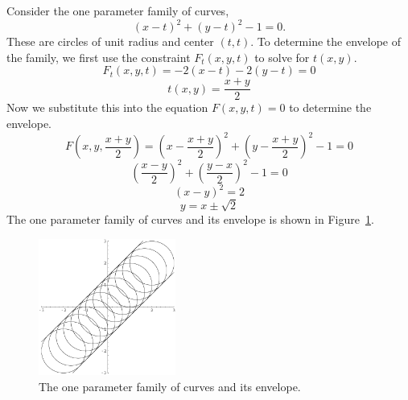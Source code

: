 \begin{Example}
  Consider the one parameter family of curves,
  \[
  (x-t)^2 + (y-t)^2 - 1 = 0.
  \]
  These are circles of unit radius and center $(t,t)$.  To determine the 
  envelope of the family, we first use the constraint $F_t(x,y,t)$ to 
  solve for $t(x,y)$.
  \[
  F_t(x,y,t) = -2(x-t) - 2(y-t) = 0
  \]
  \[
  t(x,y) = \frac{x+y}{2}
  \]
  Now we substitute this into the equation $F(x,y,t)=0$ to determine the 
  envelope.
  \[
  F \left( x,y,\frac{x+y}{2} \right) 
  = \left(x - \frac{x+y}{2} \right)^2 + \left(y - \frac{x+y}{2} \right)^2 - 1 = 0
  \]
  \[
  \left(\frac{x-y}{2} \right)^2 + \left(\frac{y-x}{2} \right)^2 - 1 = 0
  \]
  \[
  (x-y)^2 = 2
  \]
  \[
  \boxed{
    y = x \pm \sqrt{2}
    }
  \]
  The one parameter family of curves and its envelope is shown in 
  Figure~\ref{circlefamily}.




  \begin{figure}[h!]
    \begin{center}
      \includegraphics[width=0.4\textwidth]{pde/characteristics/circle}
    \end{center}
    \caption{The one parameter family of curves and its envelope.}
    \label{circlefamily}
  \end{figure}
\end{Example}






































